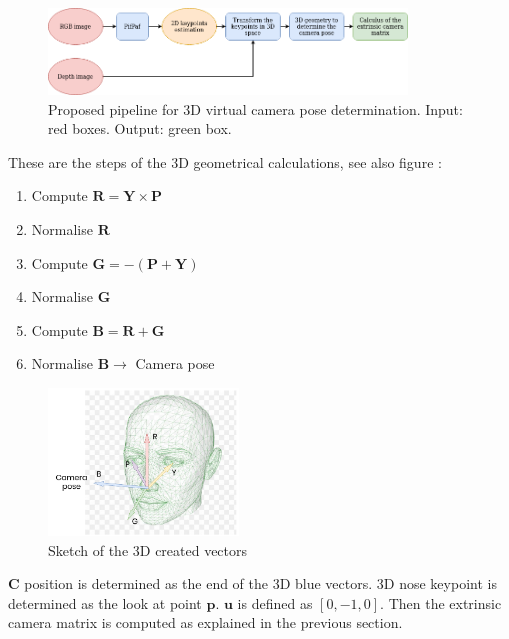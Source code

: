 \begin{figure}[H]
    \centering
    \includegraphics[width=0.85\textwidth]{images/scenario/pipeline_pifpaf.png}
    \caption{Proposed pipeline for 3D virtual camera pose determination. Input: red boxes. Output: green box.}
    \label{figure:pipeline_pifpaf}
\end{figure}

These are the steps of the 3D geometrical calculations, see also figure :

\begin{enumerate}
    \item Compute $ \mathbf{R}=\mathbf{Y} \times \mathbf{P}$
    \item Normalise $\mathbf{R}$
    \item Compute $\mathbf{G}=-(\mathbf{P}+\mathbf{Y})$
    \item Normalise $\mathbf{G}$
    \item Compute $\mathbf{B}=\mathbf{R}+\mathbf{G}$
    \item Normalise $\mathbf{B}\rightarrow$ Camera pose
\end{enumerate}

\begin{figure}[H]
    \centering
    \includegraphics[width=0.45\textwidth]{images/scenario/head_vectors.png}
    \caption{Sketch of the 3D created vectors}
    \label{figure:head_vectors}
\end{figure}

$\mathbf{C}$ position is determined as the end of the 3D blue vectors. 3D nose keypoint is determined as the look at point ${\mathbf{p}}$. $\mathbf{u}$ is defined as $[0,-1,0]$. Then the extrinsic camera matrix is computed as explained in the previous section.

